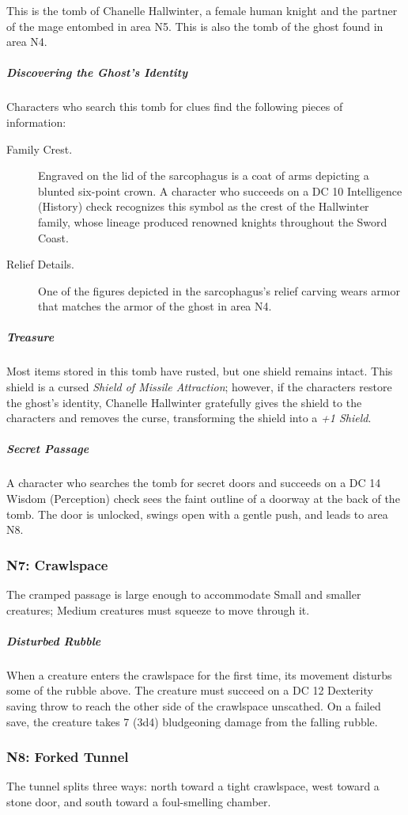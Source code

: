 \documentclass[10pt,a4paper,twoside,fancy,bg=print,twocolumn,openany,nodeprecatedcode]{dndbook}
\begin{document}
This is the tomb of Chanelle Hallwinter, a female human knight and the partner of the mage entombed in area N5. This is also the tomb of the ghost found in area N4.

\subparagraph{Discovering the Ghost's Identity}
Characters who search this tomb for clues find the following pieces of information:


\begin{description}
\item[Family Crest.]
Engraved on the lid of the sarcophagus is a coat of arms depicting a blunted six-point crown. A character who succeeds on a DC 10 Intelligence (History) check recognizes this symbol as the crest of the Hallwinter family, whose lineage produced renowned knights throughout the Sword Coast.
\item[Relief Details.]
One of the figures depicted in the sarcophagus's relief carving wears armor that matches the armor of the ghost in area N4.
\end{description}

\subparagraph{Treasure}
Most items stored in this tomb have rusted, but one shield remains intact. This shield is a cursed \textit{Shield of Missile Attraction}; however, if the characters restore the ghost's identity, Chanelle Hallwinter gratefully gives the shield to the characters and removes the curse, transforming the shield into a \textit{+1 Shield}.

\subparagraph{Secret Passage}
A character who searches the tomb for secret doors and succeeds on a DC 14 Wisdom (Perception) check sees the faint outline of a doorway at the back of the tomb. The door is unlocked, swings open with a gentle push, and leads to area N8.

\subsubsection{N7: Crawlspace}
The cramped passage is large enough to accommodate Small and smaller creatures; Medium creatures must squeeze to move through it.

\subparagraph{Disturbed Rubble}
When a creature enters the crawlspace for the first time, its movement disturbs some of the rubble above. The creature must succeed on a DC 12 Dexterity saving throw to reach the other side of the crawlspace unscathed. On a failed save, the creature takes 7 (3d4) bludgeoning damage from the falling rubble.

\subsubsection{N8: Forked Tunnel}
\begin{DndReadAloud}{}
The tunnel splits three ways: north toward a tight crawlspace, west toward a stone door, and south toward a foul-smelling chamber.

\end{DndReadAloud}
\end{document}
